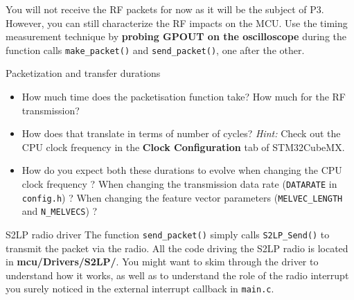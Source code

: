 You will not receive the RF packets for now as it will be the subject of P3. However, you can still characterize the RF impacts on the MCU. Use the timing measurement technique by \textbf{probing GPOUT on the oscilloscope} during the function calls \texttt{make\_packet()} and \texttt{send\_packet()}, one after the other.

\begin{bclogo}[couleur = gray!20, arrondi = 0.2, logo=\bcquestion]{Packetization and transfer durations}
\begin{itemize}
    \item How much time does the packetisation function take? How much for the RF transmission?
    \item How does that translate in terms of number of cycles? \textit{Hint:} Check out the CPU clock frequency in the \textbf{Clock Configuration} tab of STM32CubeMX.
    \item How do you expect both these durations to evolve when changing the CPU clock frequency ? When changing the transmission data rate (\texttt{DATARATE} in \texttt{config.h}) ? When changing the feature vector parameters (\texttt{MELVEC\_LENGTH} and \texttt{N\_MELVECS}) ?
\end{itemize}
\end{bclogo}

\begin{bclogo}[couleur = gray!20, arrondi = 0.2, logo=\bcinfo]{S2LP radio driver}
The function \texttt{send\_packet()} simply calls \texttt{S2LP\_Send()} to transmit the packet via the radio. All the code driving the S2LP radio is located in \textbf{mcu/Drivers/S2LP/}. You might want to skim through the driver to understand how it works, as well as to understand the role of the radio interrupt you surely noticed in the external interrupt callback in \texttt{main.c}.
\end{bclogo}
